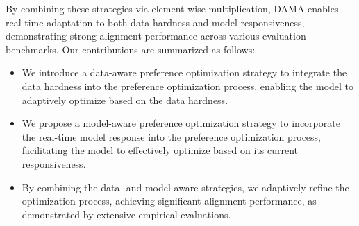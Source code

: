 By combining these strategies via element-wise multiplication, DAMA enables real-time adaptation to both data hardness and model responsiveness, demonstrating strong alignment performance across various evaluation benchmarks.
Our contributions are summarized as follows:
\begin{itemize}[leftmargin=*]
    \item We introduce a data-aware preference optimization strategy to integrate the data hardness into the preference optimization process, enabling the model to adaptively optimize based on the data hardness.
    \item We propose a model-aware preference optimization strategy to incorporate the real-time model response into the preference optimization process, facilitating the model to effectively optimize based on its current responsiveness.
    \item By combining the data- and model-aware strategies, we adaptively refine the optimization process, achieving significant alignment performance, as demonstrated by extensive empirical evaluations.
\end{itemize}



